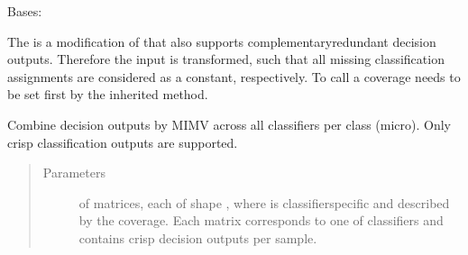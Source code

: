 \documentclass[letterpaper,10pt,english]{sphinxmanual}
\begin{document}

\begin{fulllineitems}
\label{\detokenize{pusion.core.micro_majority_vote_combiner:pusion.core.micro_majority_vote_combiner.CRMicroMajorityVoteCombiner}}
\sphinxAtStartPar
Bases: {\hyperref[\detokenize{pusion.core.micro_majority_vote_combiner:pusion.core.micro_majority_vote_combiner.MicroMajorityVoteCombiner}]{}}

\sphinxAtStartPar
The {\hyperref[\detokenize{pusion.core.micro_majority_vote_combiner:pusion.core.micro_majority_vote_combiner.CRMicroMajorityVoteCombiner}]{}} is a modification of {\hyperref[\detokenize{pusion.core.micro_majority_vote_combiner:pusion.core.micro_majority_vote_combiner.MicroMajorityVoteCombiner}]{}} that
also supports complementary\sphinxhyphen{}redundant decision outputs. Therefore the input is transformed, such that all missing
classification assignments are considered as a constant, respectively. To call {\hyperref[\detokenize{pusion.core.micro_majority_vote_combiner:pusion.core.micro_majority_vote_combiner.CRMicroMajorityVoteCombiner.combine}]{}} a coverage needs to
be set first by the inherited  method.

\begin{fulllineitems}
\label{\detokenize{pusion.core.micro_majority_vote_combiner:pusion.core.micro_majority_vote_combiner.CRMicroMajorityVoteCombiner.combine}}
\sphinxAtStartPar
Combine decision outputs by MIMV across all classifiers per class (micro).
Only crisp classification outputs are supported.
\begin{quote}\begin{description}
\item[{Parameters}] \leavevmode
\sphinxAtStartPar
{} \textendash{}  of  matrices, each of shape ,
where  is classifier\sphinxhyphen{}specific and described by the coverage.
Each matrix corresponds to one of  classifiers and contains crisp decision outputs
per sample.


\end{description}
\end{quote}
\end{fulllineitems}
\end{fulllineitems}
\end{document}
